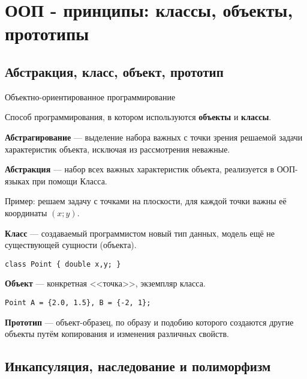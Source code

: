 \section{ООП - принципы: классы, объекты, прототипы} 

\subsection{Абстракция, класс, объект, прототип}

\begin{frame}[t,fragile]{Объектно-ориентированное программирование}

Способ программирования, в котором используются 
\textbf{объекты}
 и 
\textbf{классы}. 

\textbf{Абстрагирование} --- 
выделение набора важных с точки зрения решаемой задачи характеристик объекта, исключая из рассмотрения неважные. 

\textbf{Абстракция} --- 
набор всех важных характеристик объекта, реализуется в ООП-языках при помощи Класса. 

Пример: решаем задачу с точками на плоскости, для каждой
точки важны её координаты $(x; y)$.

\textbf{Класс} ---
создаваемый программистом новый тип данных,
модель ещё не существующей сущности (объекта).

\begin{lstlisting}
class Point { double x,y; }
\end{lstlisting}

\textbf{Объект} --- 
конкретная <<точка>>, экземпляр класса.

\begin{lstlisting}
Point A = {2.0, 1.5}, B = {-2, 1};
\end{lstlisting}

\textbf{Прототип} ---
объект-образец, по образу и подобию которого создаются другие объекты
путём копирования и изменения различных свойств. 
\end{frame}

\subsection{Инкапсуляция, наследование и полиморфизм}


